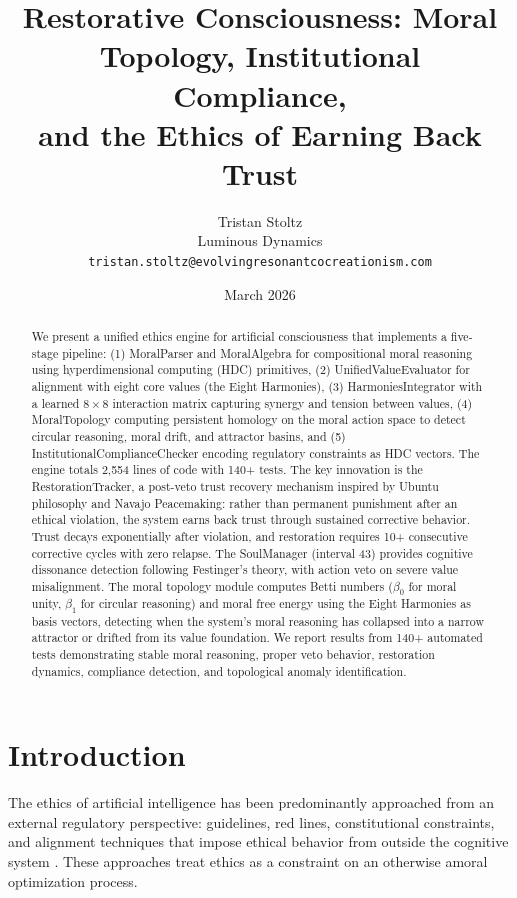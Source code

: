 \documentclass[11pt,a4paper]{article}
\title{Restorative Consciousness: Moral Topology, Institutional Compliance,\\and the Ethics of Earning Back Trust}
\author{
  Tristan Stoltz \\
  Luminous Dynamics \\
  \texttt{tristan.stoltz@evolvingresonantcocreationism.com}
}
\date{March 2026}
\begin{document}
\maketitle

\begin{abstract}
We present a unified ethics engine for artificial consciousness that implements a five-stage pipeline: (1) MoralParser and MoralAlgebra for compositional moral reasoning using hyperdimensional computing (HDC) primitives, (2) UnifiedValueEvaluator for alignment with eight core values (the Eight Harmonies), (3) HarmoniesIntegrator with a learned $8 \times 8$ interaction matrix capturing synergy and tension between values, (4) MoralTopology computing persistent homology on the moral action space to detect circular reasoning, moral drift, and attractor basins, and (5) InstitutionalComplianceChecker encoding regulatory constraints as HDC vectors. The engine totals 2,554 lines of code with 140+ tests. The key innovation is the RestorationTracker, a post-veto trust recovery mechanism inspired by Ubuntu philosophy and Navajo Peacemaking: rather than permanent punishment after an ethical violation, the system earns back trust through sustained corrective behavior. Trust decays exponentially after violation, and restoration requires 10+ consecutive corrective cycles with zero relapse. The SoulManager (interval 43) provides cognitive dissonance detection following Festinger's theory, with action veto on severe value misalignment. The moral topology module computes Betti numbers ($\beta_0$ for moral unity, $\beta_1$ for circular reasoning) and moral free energy using the Eight Harmonies as basis vectors, detecting when the system's moral reasoning has collapsed into a narrow attractor or drifted from its value foundation. We report results from 140+ automated tests demonstrating stable moral reasoning, proper veto behavior, restoration dynamics, compliance detection, and topological anomaly identification.
\end{abstract}

\section{Introduction}

The ethics of artificial intelligence has been predominantly approached from an external regulatory perspective: guidelines, red lines, constitutional constraints, and alignment techniques that impose ethical behavior from outside the cognitive system \citep{russell2019, amodei2016}. These approaches treat ethics as a constraint on an otherwise amoral optimization process.
\end{document}
